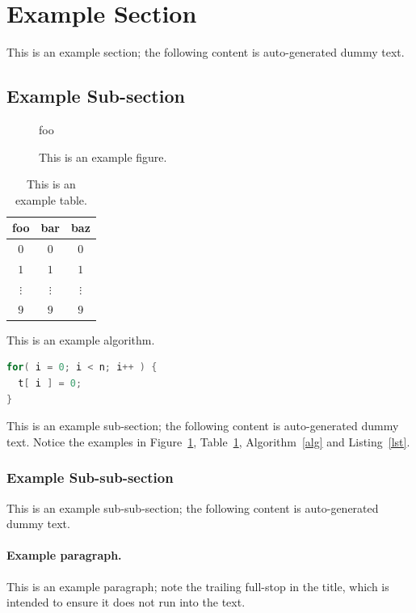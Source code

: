 \section{Example Section}

This is an example section;
the following content is auto-generated dummy text.

\subsection{Example Sub-section}

\begin{figure}[t]
\centering
foo
\caption{This is an example figure.}
\label{fig}
\end{figure}

\begin{table}[t]
\centering
\begin{tabular}{|cc|c|}
\hline
foo      & bar      & baz      \\
\hline
$0     $ & $0     $ & $0     $ \\
$1     $ & $1     $ & $1     $ \\
$\vdots$ & $\vdots$ & $\vdots$ \\
$9     $ & $9     $ & $9     $ \\
\hline
\end{tabular}
\caption{This is an example table.}
\label{tab}
\end{table}

\begin{algorithm}[t]
\caption{This is an example algorithm.}
\label{alg}
\end{algorithm}

\begin{lstlisting}[float={t},caption={This is an example listing.},label={lst},language=C]
for( i = 0; i < n; i++ ) {
  t[ i ] = 0;
}
\end{lstlisting}

This is an example sub-section;
the following content is auto-generated dummy text.
Notice the examples in Figure~\ref{fig}, Table~\ref{tab}, Algorithm~\ref{alg}
and Listing~\ref{lst}.

\subsubsection{Example Sub-sub-section}

This is an example sub-sub-section;
the following content is auto-generated dummy text.

\paragraph{Example paragraph.}

This is an example paragraph; note the trailing full-stop in the title,
which is intended to ensure it does not run into the text.
